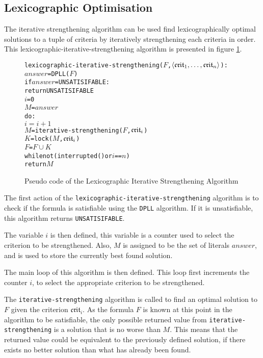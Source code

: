 \subsection{Lexicographic Optimisation}
\label{impl.lexiterstre}
The iterative strengthening algorithm can be used find lexicographically optimal solutions to a tuple of criteria by iteratively strengthening each criteria in order.
This lexicographic-iterative-strengthening algorithm is presented in figure \ref{impl.lexstrength}.

\begin{figure}[htp]
\begin{center}
\begin{alltt}
lexicographic-iterative-strengthening(\(F\),\(\langle{}\mathfrak{crit}\sb{1}, \ldots ,\mathfrak{crit}\sb{n}\rangle\)):  
    \(answer\) = DPLL(\(F\))
    if \(answer\) = UNSATISIFABLE:
        return UNSATISIFABLE
    \(i\) = 0
    \(M\) = \(answer\)
    do:
        \(i = i + 1\)
        \(M\) = iterative-strengthening(\(F\),\(\mathfrak{crit}\sb{i}\))
        \(K\) = lock(\(M\),\(\mathfrak{crit}\sb{i}\))
        \(F\) = \(F \cup K\)
    while not (interrupted() or \(i\) == \(n\))
    return \(M\) 
\end{alltt}
  \caption{Pseudo code of the Lexicographic Iterative Strengthening Algorithm}
  \label{impl.lexstrength}
\end{center}
\end{figure}

The first action of the \texttt{lexicographic-iterative-strengthening} algorithm is to check if the formula is satisfiable using the \texttt{DPLL} algorithm.
If it is unsatisfiable, this algorithm returns \texttt{UNSATISIFABLE}.

The variable $i$ is then defined, this variable is a counter used to select the criterion to be strengthened.
Also, $M$ is assigned to be the set of literals $answer$, and is used to store the currently best found solution.

The main loop of this algorithm is then defined.
This loop first increments the counter $i$, to select the appropriate criterion to be strengthened.

The \texttt{iterative-strengthening} algorithm is called to find an optimal solution to $F$ given the criterion $\mathfrak{crit}_i$.
As the formula $F$ is known at this point in the algorithm to be satisfiable, the only possible returned value from \texttt{iterative-strengthening}
is a solution that is no worse than $M$.
This means that the returned value could be equivalent to the previously defined solution, if there exists no better solution than what has already been found.

